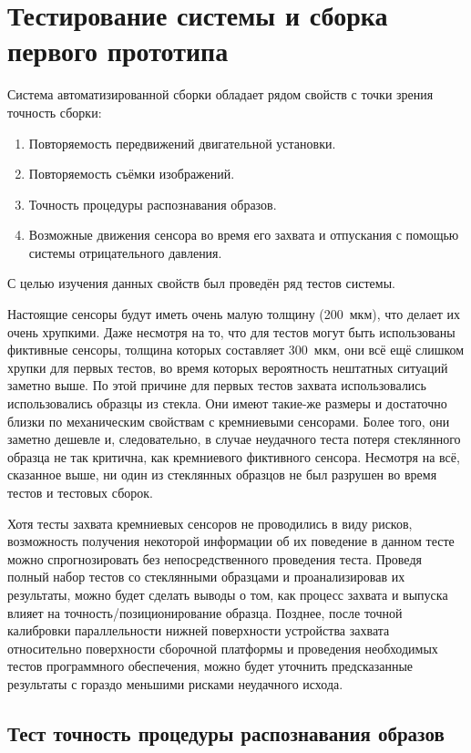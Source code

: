 \chapter{Тестирование системы и сборка первого прототипа}

Система автоматизированной сборки обладает рядом свойств с точки зрения точность сборки:
\begin{enumerate}
\setlength\itemsep{-0.5em}
\item Повторяемость передвижений двигательной установки.
\item Повторяемость съёмки изображений.
\item Точность процедуры распознавания образов.
\item Возможные движения сенсора во время его захвата и отпускания с помощью системы отрицательного давления.
\end{enumerate}

С целью изучения данных свойств был проведён ряд тестов системы.

Настоящие сенсоры будут иметь очень малую толщину (200~мкм), что делает их очень хрупкими. Даже несмотря на то, что для тестов могут быть использованы фиктивные сенсоры, толщина которых составляет 300~мкм, они всё ещё слишком хрупки для первых тестов, во время которых вероятность нештатных ситуаций заметно выше. По этой причине для первых тестов захвата использовались использовались образцы из стекла. Они имеют такие-же размеры и достаточно близки по механическим свойствам с кремниевыми сенсорами. Более того, они заметно дешевле и, следовательно, в случае неудачного теста потеря стеклянного образца не так критична, как кремниевого фиктивного сенсора. Несмотря на всё, сказанное выше, ни один из стеклянных образцов не был разрушен во время тестов и тестовых сборок.

Хотя тесты захвата кремниевых сенсоров не проводились в виду рисков, возможность получения некоторой информации об их поведение в данном тесте можно спрогнозировать без непосредственного проведения теста. Проведя полный набор тестов со стеклянными образцами и проанализировав их результаты, можно будет сделать выводы о том, как процесс захвата и выпуска влияет на точность/позиционирование образца. Позднее, после точной калибровки параллельности нижней поверхности устройства захвата относительно поверхности сборочной платформы и проведения необходимых тестов программного обеспечения, можно будет уточнить предсказанные результаты с гораздо меньшими рисками неудачного исхода.

\section{Тест точность процедуры распознавания образов}

